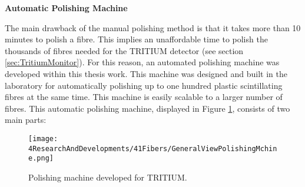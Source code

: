 \newpage
\textbf{Automatic Polishing Machine}

The main drawback of the manual polishing method is that it takes more than 10 minutes to polish a fibre. This implies an unaffordable time to polish the thousands of fibres needed for the TRITIUM detector (see section \ref{sec:TritiumMonitor}). For this reason, an automated polishing machine was developed within this thesis work. This machine was designed and built in the laboratory for automatically polishing up to one hundred plastic scintillating fibres at the same time. This machine is easily scalable to a larger number of fibres. This automatic polishing machine, displayed in Figure \ref{fig:GeneralViewPolishingMachine}, consists of two main parts:

\begin{figure}[h]
\centering
\texttt{[image: 4ResearchAndDevelopments/41Fibers/GeneralViewPolishingMchine.png]}
\caption{Polishing machine developed for TRITIUM.\label{fig:GeneralViewPolishingMachine}}
\end{figure}

